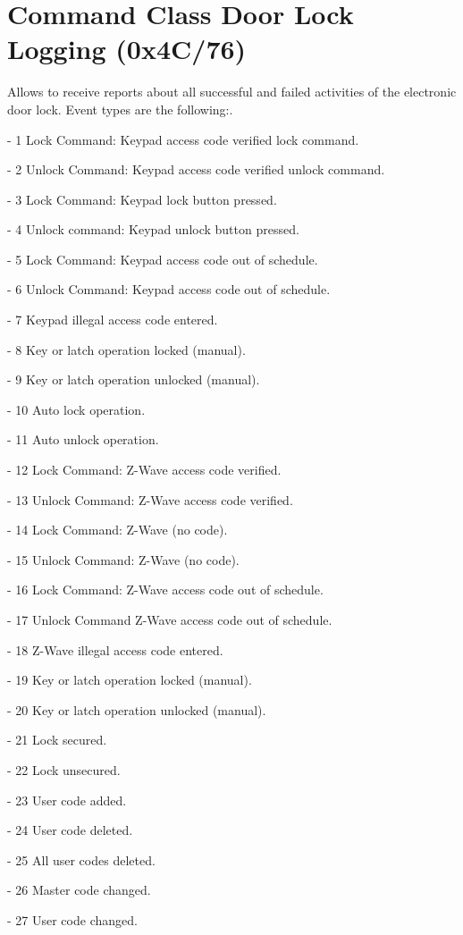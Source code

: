 \section{Command Class Door Lock Logging (0x4C/76)}

Allows to receive reports about all successful and failed activities of the electronic door lock. Event types are the following:. 

- 1 Lock Command: Keypad access code verified lock command. 

- 2 Unlock Command: Keypad access code verified unlock command. 

- 3 Lock Command: Keypad lock button pressed. 

- 4 Unlock command: Keypad unlock button pressed. 

- 5 Lock Command: Keypad access code out of schedule. 

- 6 Unlock Command: Keypad access code out of schedule. 

- 7 Keypad illegal access code entered. 

- 8 Key or latch operation locked (manual). 

- 9 Key or latch operation unlocked (manual). 

- 10 Auto lock operation. 

- 11 Auto unlock operation. 

- 12 Lock Command: Z-Wave access code verified. 

- 13 Unlock Command: Z-Wave access code verified. 

- 14 Lock Command: Z-Wave (no code). 

- 15 Unlock Command: Z-Wave (no code). 

- 16 Lock Command: Z-Wave access code out of schedule. 

- 17 Unlock Command Z-Wave access code out of schedule. 

- 18 Z-Wave illegal access code entered. 

- 19 Key or latch operation locked (manual). 

- 20 Key or latch operation unlocked (manual). 

- 21 Lock secured. 

- 22 Lock unsecured. 

- 23 User code added. 

- 24 User code deleted. 

- 25 All user codes deleted. 

- 26 Master code changed. 

- 27 User code changed. 

